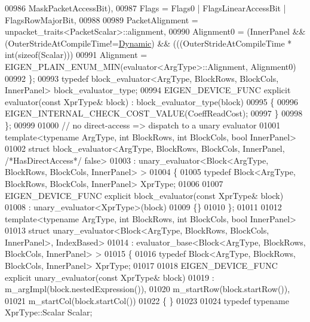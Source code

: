 \begin{DoxyCode}
00986                                            MaskPacketAccessBit),
00987     Flags = Flags0 | FlagsLinearAccessBit | FlagsRowMajorBit,
00988     
00989     PacketAlignment = unpacket\_traits<PacketScalar>::alignment,
00990     Alignment0 = (InnerPanel && (OuterStrideAtCompileTime!=\hyperlink{namespace_eigen_ad81fa7195215a0ce30017dfac309f0b2}{Dynamic}) && (((OuterStrideAtCompileTime *
       int(sizeof(Scalar))) %
00991     Alignment = EIGEN\_PLAIN\_ENUM\_MIN(evaluator<ArgType>::Alignment, Alignment0)
00992   \};
00993   \textcolor{keyword}{typedef} block\_evaluator<ArgType, BlockRows, BlockCols, InnerPanel> block\_evaluator\_type;
00994   EIGEN\_DEVICE\_FUNC \textcolor{keyword}{explicit} evaluator(\textcolor{keyword}{const} XprType& block) : block\_evaluator\_type(block)
00995   \{
00996     EIGEN\_INTERNAL\_CHECK\_COST\_VALUE(CoeffReadCost);
00997   \}
00998 \};
00999 
01000 \textcolor{comment}{// no direct-access => dispatch to a unary evaluator}
01001 \textcolor{keyword}{template}<\textcolor{keyword}{typename} ArgType, \textcolor{keywordtype}{int} BlockRows, \textcolor{keywordtype}{int} BlockCols, \textcolor{keywordtype}{bool} InnerPanel>
01002 \textcolor{keyword}{struct }block\_evaluator<ArgType, BlockRows, BlockCols, InnerPanel, \textcolor{comment}{/*HasDirectAccess*/} false>
01003   : unary\_evaluator<Block<ArgType, BlockRows, BlockCols, InnerPanel> >
01004 \{
01005   \textcolor{keyword}{typedef} Block<ArgType, BlockRows, BlockCols, InnerPanel> XprType;
01006 
01007   EIGEN\_DEVICE\_FUNC \textcolor{keyword}{explicit} block\_evaluator(\textcolor{keyword}{const} XprType& block)
01008     : unary\_evaluator<XprType>(block) 
01009   \{\}
01010 \};
01011 
01012 \textcolor{keyword}{template}<\textcolor{keyword}{typename} ArgType, \textcolor{keywordtype}{int} BlockRows, \textcolor{keywordtype}{int} BlockCols, \textcolor{keywordtype}{bool} InnerPanel>
01013 \textcolor{keyword}{struct }unary\_evaluator<Block<ArgType, BlockRows, BlockCols, InnerPanel>, IndexBased>
01014   : evaluator\_base<Block<ArgType, BlockRows, BlockCols, InnerPanel> >
01015 \{
01016   \textcolor{keyword}{typedef} Block<ArgType, BlockRows, BlockCols, InnerPanel> XprType;
01017 
01018   EIGEN\_DEVICE\_FUNC \textcolor{keyword}{explicit} unary\_evaluator(\textcolor{keyword}{const} XprType& block)
01019     : m\_argImpl(block.nestedExpression()), 
01020       m\_startRow(block.startRow()), 
01021       m\_startCol(block.startCol()) 
01022   \{ \}
01023  
01024   \textcolor{keyword}{typedef} \textcolor{keyword}{typename} XprType::Scalar Scalar;

\end{DoxyCode}
